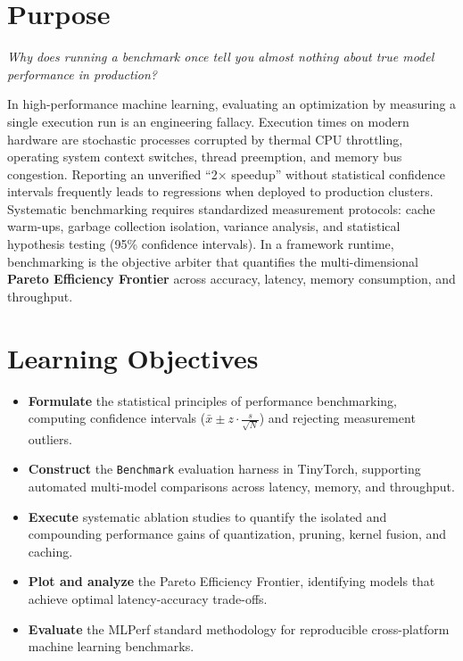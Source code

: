 \documentclass[
  letterpaper,
]{scrbook}
\providecommand{\tightlist}{%
  \setlength{\itemsep}{0pt}\setlength{\parskip}{0pt}}
\begin{document}
\section*{Purpose}\label{purpose-21}


\emph{Why does running a benchmark once tell you almost nothing about
true model performance in production?}

In high-performance machine learning, evaluating an optimization by
measuring a single execution run is an engineering fallacy. Execution
times on modern hardware are stochastic processes corrupted by thermal
CPU throttling, operating system context switches, thread preemption,
and memory bus congestion. Reporting an unverified ``2× speedup''
without statistical confidence intervals frequently leads to regressions
when deployed to production clusters. Systematic benchmarking requires
standardized measurement protocols: cache warm-ups, garbage collection
isolation, variance analysis, and statistical hypothesis testing (95\%
confidence intervals). In a framework runtime, benchmarking is the
objective arbiter that quantifies the multi-dimensional \textbf{Pareto
Efficiency Frontier} across accuracy, latency, memory consumption, and
throughput.

\section{Learning Objectives}\label{learning-objectives-19}

\begin{itemize}
\tightlist
\item
  \textbf{Formulate} the statistical principles of performance
  benchmarking, computing confidence intervals
  (\(\bar{x} \pm z \cdot \frac{s}{\sqrt{N}}\)) and rejecting measurement
  outliers.
\item
  \textbf{Construct} the \texttt{Benchmark} evaluation harness in
  TinyTorch, supporting automated multi-model comparisons across
  latency, memory, and throughput.
\item
  \textbf{Execute} systematic ablation studies to quantify the isolated
  and compounding performance gains of quantization, pruning, kernel
  fusion, and caching.
\item
  \textbf{Plot and analyze} the Pareto Efficiency Frontier, identifying
  models that achieve optimal latency-accuracy trade-offs.
\item
  \textbf{Evaluate} the MLPerf standard methodology for reproducible
  cross-platform machine learning benchmarks.
\end{itemize}
\end{document}
